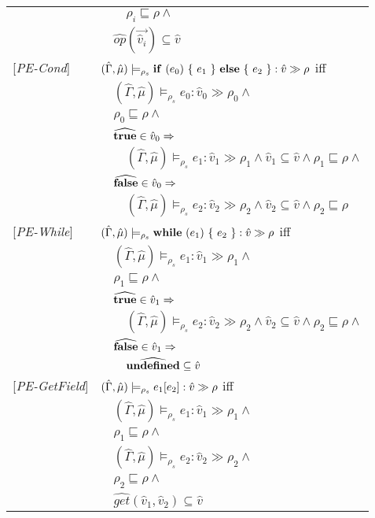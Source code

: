 \documentclass[[12pt,a4paper,twoside,openrigh]{article}
\newcommand{\vat}[0]{\hat{v}}
\newcommand{\muat}[0]{\hat{\mu}}
\newcommand{\Env}[0]{\hat{\Gamma}}
\newcommand{\modelrho}{\models_{\rho_s}}
\newcommand{\aenvs}{(\Env,\muat)}
\newcommand{\caesti}[2]{\aenvs \modelrho #1 : \vat_{#2} \gg \rho_{#2}}
\newcommand{\caest}[1]{\aenvs \modelrho #1 : \vat \gg \rho}
\begin{document}
\begin{tabular}{l l l l}
&&&$\rho_i \sqsubseteq \rho \wedge$\\
&&\multicolumn{2}{l}{$\widehat{op} (\vec{\vat_i}) \subseteq \vat $}\\
{[\textit{PE-Cond}]}&\multicolumn{3}{l}{$\caest {\cond {e_0} {e_1} {e_2}} $ iff}\\
&&\multicolumn{2}{l}{$\caesti {e_0} {0} \wedge$}\\
&&\multicolumn{2}{l}{$\rho_0 \sqsubseteq \rho \wedge$} \\
&&\multicolumn{2}{l}{$\widehat{\true} \in \vat_0 \Rightarrow$}\\
&&&$\caesti {e_1} {1} \wedge \vat_1 \subseteq \vat \wedge \rho_1 \sqsubseteq \rho \wedge$ \\
&&\multicolumn{2}{l}{$\widehat{\false} \in \vat_0 \Rightarrow$}\\
&&&$\caesti {e_2} {2} \wedge \vat_2 \subseteq \vat \wedge \rho_2 \sqsubseteq \rho$ \\
{[\textit{PE-While}]}&\multicolumn{3}{l}{$\caest {\while {e_1} {e_2}} $ iff}\\
&&\multicolumn{2}{l}{$\caesti {e_1} {1} \wedge $}\\
&&\multicolumn{2}{l}{$\rho_1 \sqsubseteq \rho \wedge$} \\
&&\multicolumn{2}{l}{$\widehat{\true} \in \vat_1 \Rightarrow$}\\
&&&$\caesti {e_2} {2} \wedge \vat_2 \subseteq \vat \wedge \rho_2 \sqsubseteq \rho \wedge$\\
&&\multicolumn{2}{l}{$\widehat{\false} \in \vat_1 \Rightarrow$}\\
&&&$\widehat{\undef} \subseteq \vat$\\
{[\textit{PE-GetField}]}&\multicolumn{3}{l}{$\caest {\lookup {e_1} {e_2}} $ iff}\\
&&\multicolumn{2}{l}{$ \caesti {e_1} {1} \wedge $}\\
&&\multicolumn{2}{l}{$\rho_1 \sqsubseteq \rho \wedge$} \\
&&\multicolumn{2}{l}{$ \caesti {e_2} {2} \wedge $} \\
&&\multicolumn{2}{l}{$\rho_2 \sqsubseteq \rho \wedge$} \\
&&\multicolumn{2}{l}{$\widehat{get} (\vat_1, \vat_2) \subseteq \vat$} \\
\end{tabular}\newpage
\end{document}
